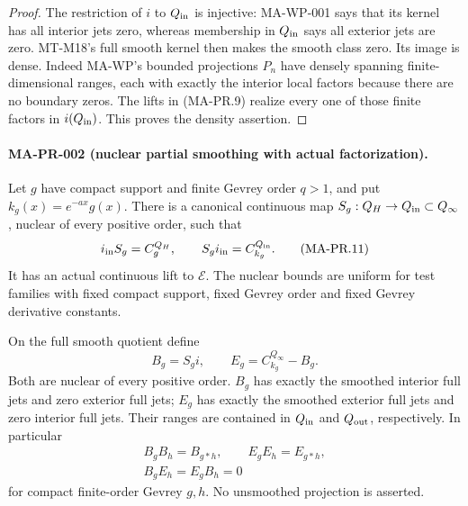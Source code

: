 \begin{proof}
The restriction of $i$ to $Q_{\rm in}$ is injective:
MA-WP-001 says that its kernel has all interior jets
zero, whereas membership in $Q_{\rm in}$ says all
exterior jets are zero.  MT-M18's full smooth kernel
then makes the smooth class zero.  Its image is dense.
Indeed MA-WP's bounded projections $P_n$ have densely
spanning finite-dimensional ranges, each with exactly
the interior local factors because there are no
boundary zeros.  The lifts in (MA-PR.9) realize every
one of those finite factors in $i(Q_{\rm in})$.
This proves the density assertion.
\end{proof}

\paragraph{MA-PR-002 (nuclear partial smoothing with actual factorization).}
Let $g$ have compact support and finite Gevrey order $q>1$,
and put $k_g(x)=e^{-ax}g(x)$.
There is a canonical continuous map
$S_g:Q_H\to Q_{\rm in}\subset Q_\infty$, nuclear of every
positive order, such that
\[
             i_{\rm in}S_g=C_g^{Q_H},\qquad
             S_g i_{\rm in}=C_{k_g}^{Q_{\rm in}}.
\tag{MA-PR.11}
\]
It has an actual continuous lift to $\mathcal E$.
The nuclear bounds are uniform for test families with
fixed compact support, fixed Gevrey order and fixed
Gevrey derivative constants.

On the full smooth quotient define
\[
       B_g=S_g i,\qquad E_g=C_{k_g}^{Q_\infty}-B_g .
\tag{MA-PR.12}
\]
Both are nuclear of every positive order.
$B_g$ has exactly the smoothed interior full jets and
zero exterior full jets; $E_g$ has exactly the smoothed
exterior full jets and zero interior full jets.
Their ranges are contained in $Q_{\rm in}$ and
$Q_{\rm out}$, respectively.  In particular
\[
\begin{gathered}
 B_gB_h=B_{g*h},\qquad E_gE_h=E_{g*h},\\
 B_gE_h=E_gB_h=0
\end{gathered}
\tag{MA-PR.13}
\]
for compact finite-order Gevrey $g,h$.
No unsmoothed projection is asserted.

